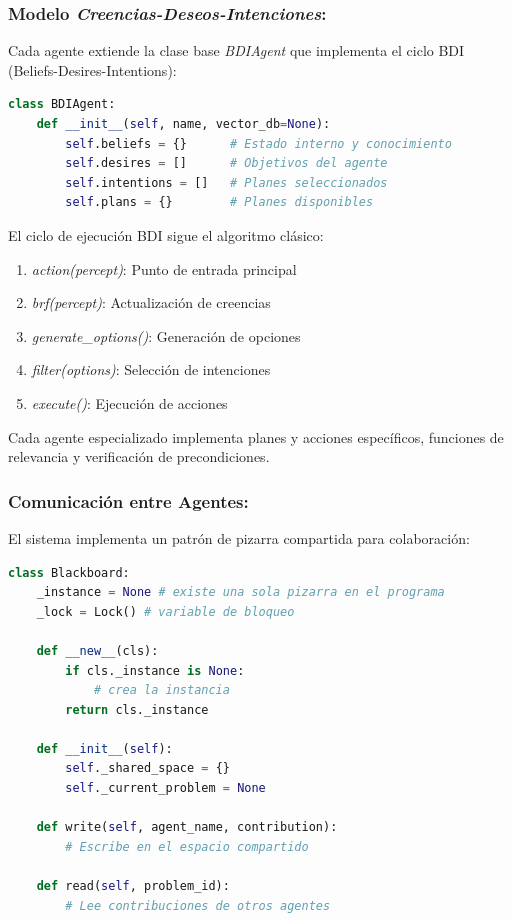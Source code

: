 \documentclass[10pt]{llncs}
\begin{document}
\subsubsection{Modelo \textit{Creencias-Deseos-Intenciones}:}
Cada agente extiende la clase base \textit{BDIAgent} que implementa el ciclo BDI (Beliefs-Desires-Intentions):

\begin{lstlisting}[language=Python,basicstyle=\small\ttfamily]
class BDIAgent:
    def __init__(self, name, vector_db=None):
        self.beliefs = {}      # Estado interno y conocimiento
        self.desires = []      # Objetivos del agente
        self.intentions = []   # Planes seleccionados
        self.plans = {}        # Planes disponibles
\end{lstlisting}

El ciclo de ejecución BDI sigue el algoritmo clásico:
\begin{enumerate}
    \item \textit{action(percept)}: Punto de entrada principal
    \item \textit{brf(percept)}: Actualización de creencias
    \item \textit{generate\_options()}: Generación de opciones
    \item \textit{filter(options)}: Selección de intenciones
    \item \textit{execute()}: Ejecución de acciones
\end{enumerate}

Cada agente especializado implementa planes y acciones específicos, funciones de relevancia y 
verificación de precondiciones.

\subsubsection{Comunicación entre Agentes:}
El sistema implementa un patrón de pizarra compartida para colaboración:

\begin{lstlisting}[language=Python,basicstyle=\small\ttfamily]
class Blackboard:
    _instance = None # existe una sola pizarra en el programa
    _lock = Lock() # variable de bloqueo

    def __new__(cls):
        if cls._instance is None:
            # crea la instancia
        return cls._instance

    def __init__(self):
        self._shared_space = {}
        self._current_problem = None
        
    def write(self, agent_name, contribution):
        # Escribe en el espacio compartido
        
    def read(self, problem_id):
        # Lee contribuciones de otros agentes
\end{lstlisting}
\end{document}
